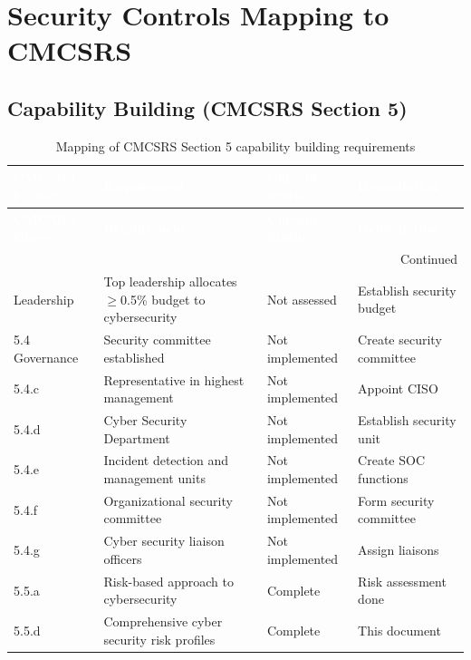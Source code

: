 \section{Security Controls Mapping to CMCSRS}

\subsection{Capability Building (CMCSRS Section 5)}
\begin{center}
\begin{longtable}{|p{}|p{}|p{}|p{}|}
\caption[CMCSRS Section 5 Mapping]{Mapping of CMCSRS Section 5 capability building requirements}
\label{tab:cmcsrs-sec5} \\
\hline
\rowcolor{mooveblue}
\textcolor{white}{\textbf{CMCSRS Clause}} & \textcolor{white}{\textbf{Requirement}} & \textcolor{white}{\textbf{Current Status}} & \textcolor{white}{\textbf{Remediation}} \\
\hline
\endfirsthead
\hline
\rowcolor{mooveblue}
\textcolor{white}{\textbf{CMCSRS Clause}} & \textcolor{white}{\textbf{Requirement}} & \textcolor{white}{\textbf{Current Status}} & \textcolor{white}{\textbf{Remediation}} \\
\hline
\endhead
\hline
\multicolumn{4}{|r|}{Continued} \\
\hline
\endfoot
\hline
\endlastfoot
5.3 Leadership & Top leadership allocates $\ge$0.5\% budget to cybersecurity & Not assessed & Establish security budget \\
5.4 Governance & Security committee established & Not implemented & Create security committee \\
5.4.c & Representative in highest management & Not implemented & Appoint CISO \\
5.4.d & Cyber Security Department & Not implemented & Establish security unit \\
5.4.e & Incident detection and management units & Not implemented & Create SOC functions \\
5.4.f & Organizational security committee & Not implemented & Form security committee \\
5.4.g & Cyber security liaison officers & Not implemented & Assign liaisons \\
5.5.a & Risk-based approach to cybersecurity & Complete & Risk assessment done \\
5.5.d & Comprehensive cyber security risk profiles & Complete & This document \\

\end{longtable}
\end{center}
